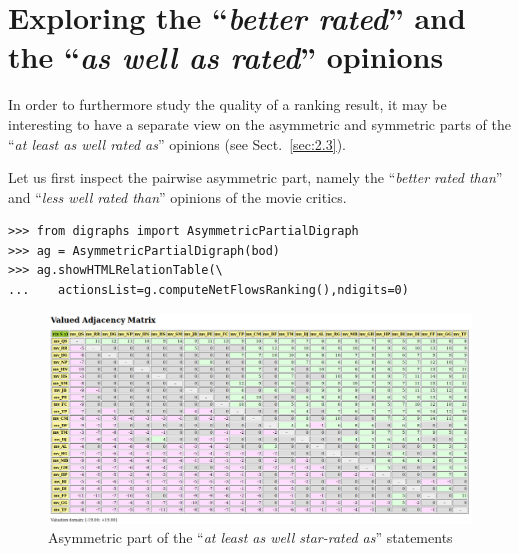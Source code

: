 \section{Exploring the ``\emph{better rated}''  and the ``\emph{as well as rated}'' opinions}
\label{sec:16.6}

In order to furthermore study the quality of a ranking result, it may be interesting to have a separate view on the asymmetric and symmetric parts of the ``\emph{at least as well rated as}'' opinions (see Sect.~\ref{sec:2.3}).

Let us first inspect the pairwise asymmetric part, namely the ``\emph{better rated than}'' and ``\emph{less well rated than}'' opinions of the movie critics. 
\begin{lstlisting}
>>> from digraphs import AsymmetricPartialDigraph
>>> ag = AsymmetricPartialDigraph(bod)
>>> ag.showHTMLRelationTable(\
...    actionsList=g.computeNetFlowsRanking(),ndigits=0)
\end{lstlisting}
\begin{figure}[ht]
\includegraphics[width=\hsize]{Figures/16-5-asymmetricPart.png}
\caption{Asymmetric part of the ``\emph{at least as well star-rated as}'' statements}
\label{fig:16.5}       %
\end{figure}

